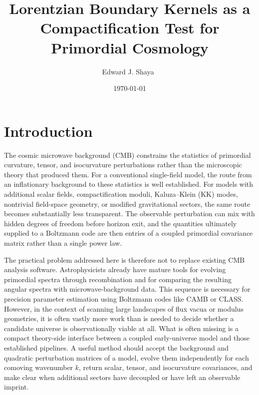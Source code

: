 \documentclass[11pt,a4paper]{article}
\title{Lorentzian Boundary Kernels as a Compactification Test for Primordial Cosmology}
\author{Edward J. Shaya\ \orcidlink{0000-0002-3234-8699}}
\affiliation{Department of Astronomy, University of Maryland, College Park, USA}
\date{\today}
\begin{document}
\maketitle
\flushbottom

\section{Introduction}
The cosmic microwave background (CMB) constrains the statistics of primordial curvature, tensor, and isocurvature perturbations rather than the microscopic theory that produced them.  For a conventional single-field model, the route from an inflationary background to these statistics is well established.  For models with additional scalar fields, compactification moduli, Kaluza--Klein (KK) modes, nontrivial field-space geometry, or modified gravitational sectors, the same route becomes substantially less transparent.  The observable perturbation can mix with hidden degrees of freedom before horizon exit, and the quantities ultimately supplied to a Boltzmann code are then entries of a coupled primordial covariance matrix rather than a single power law.

The practical problem addressed here is therefore not to replace existing CMB analysis software. Astrophysicists already have mature tools for evolving primordial spectra through recombination and for comparing the resulting angular spectra with microwave-background data. This sequence is necessary for precision parameter estimation using Boltzmann codes like CAMB or CLASS. However, in the context of scanning large landscapes of flux vacua or modulus geometries, it is often vastly more work than is needed to decide whether a candidate universe is observationally viable at all. What is often missing is a compact theory-side interface between a coupled early-universe model and those established pipelines. A useful method should accept the background and quadratic perturbation matrices of a model, evolve them independently for each comoving wavenumber $k$, return scalar, tensor, and isocurvature covariances, and make clear when additional sectors have decoupled or have left an observable imprint.
\end{document}
